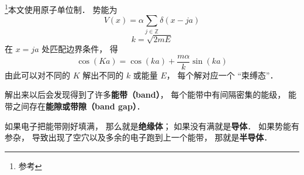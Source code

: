 
\begin{issues}
\issueDraft
\end{issues}


\footnote{参考\cite{GriffQ}}本文使用原子单位制． 势能为
\begin{equation}
V(x) = \alpha \sum_{j\in \mathbb Z} \delta(x - ja)
\end{equation}
\begin{equation}
k = \sqrt{2mE}
\end{equation}
在 $x = ja$ 处匹配边界条件， 得
\begin{equation}
\cos(K a) = \cos(ka) + \frac{m\alpha}{k}\sin(ka)
\end{equation}
由此可以对不同的 $K$ 解出不同的 $k$ 或能量 $E$， 每个解对应一个 “束缚态”．

解出来以后会发现得到了许多\textbf{能带（band）}， 每个能带中有间隔密集的能级， 能带之间存在\textbf{能隙或带隙（band gap）}．

如果电子把能带刚好填满， 那么就是\textbf{绝缘体}； 如果没有满就是\textbf{导体}． 如果势能有参杂， 导致出现了空穴以及多余的电子跑到上一个能带， 那就是\textbf{半导体}．
